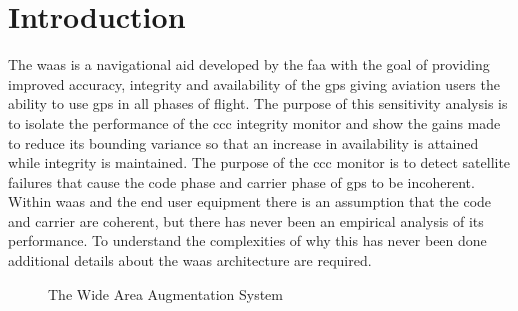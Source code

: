 \chapter{Introduction}
\label{chapter:introduction}
\acresetall
The \ac{waas} is a navigational aid developed by the \ac{faa} with the goal of providing improved accuracy, integrity and availability of the \ac{gps} giving aviation users the ability to use \ac{gps} in all phases of flight.  The purpose of this sensitivity analysis is to isolate the performance of the \ac{ccc} integrity monitor and show the gains made to reduce its bounding variance so that an increase in availability is attained while integrity is maintained. The purpose of the \ac{ccc} monitor is to detect satellite failures that cause the code phase and carrier phase of \ac{gps} to be incoherent.  Within \ac{waas} and the end user equipment there is an assumption that the code and carrier are coherent, but there has never been an empirical analysis of its performance.  To understand the complexities of why this has never been done additional details about the \ac{waas} architecture are required.

\begin{figure}
	\centering
	\caption{The Wide Area Augmentation System}
	\label{fig:WAAS-Overview-1}
\end{figure}

